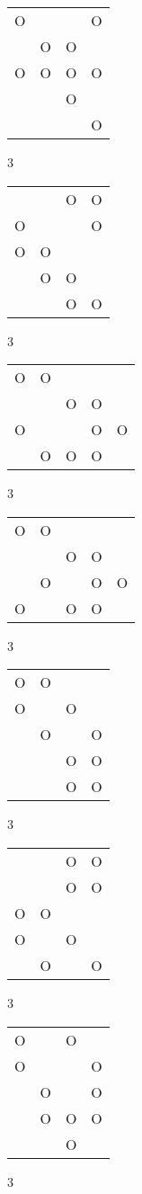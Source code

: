 \begin{tabular}{|m{0.2cm}m{0.2cm}m{0.2cm}m{0.2cm}|}\hline
O& & &O\\
 &O&O& \\
O&O&O&O\\
 & &O& \\
 & & &O\\
\hline\end{tabular}3
\begin{tabular}{|m{0.2cm}m{0.2cm}m{0.2cm}m{0.2cm}|}\hline
 & &O&O\\
O& & &O\\
O&O& & \\
 &O&O& \\
 & &O&O\\
\hline\end{tabular}3
\begin{tabular}{|m{0.2cm}m{0.2cm}m{0.2cm}m{0.2cm}m{0.2cm}|}\hline
O&O& & & \\
 & &O&O& \\
O& & &O&O\\
 &O&O&O& \\
\hline\end{tabular}3
\begin{tabular}{|m{0.2cm}m{0.2cm}m{0.2cm}m{0.2cm}m{0.2cm}|}\hline
O&O& & & \\
 & &O&O& \\
 &O& &O&O\\
O& &O&O& \\
\hline\end{tabular}3
\begin{tabular}{|m{0.2cm}m{0.2cm}m{0.2cm}m{0.2cm}|}\hline
O&O& & \\
O& &O& \\
 &O& &O\\
 & &O&O\\
 & &O&O\\
\hline\end{tabular}3
\begin{tabular}{|m{0.2cm}m{0.2cm}m{0.2cm}m{0.2cm}|}\hline
 & &O&O\\
 & &O&O\\
O&O& & \\
O& &O& \\
 &O& &O\\
\hline\end{tabular}3
\begin{tabular}{|m{0.2cm}m{0.2cm}m{0.2cm}m{0.2cm}|}\hline
O& &O& \\
O& & &O\\
 &O& &O\\
 &O&O&O\\
 & &O& \\
\hline\end{tabular}3
